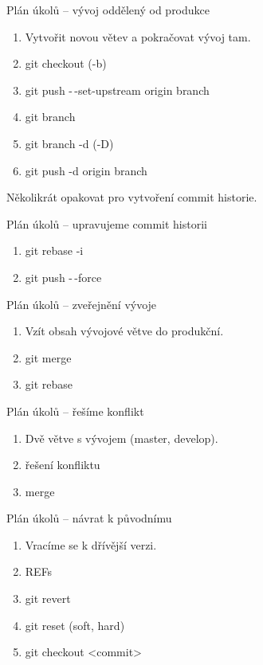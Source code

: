 \documentclass[14pt]{beamer}
\begin{document}
	\begin{frame}{Plán úkolů -- vývoj oddělený od produkce}
	\begin{enumerate}
		\item Vytvořit novou větev a pokračovat vývoj tam.
		\item git checkout (-b)
		\item git push -\,-set-upstream origin branch
		\item git branch
		\item git branch -d (-D)
		\item git push -d origin branch
	\end{enumerate}
	Několikrát opakovat pro vytvoření commit historie.
	\end{frame}

	\begin{frame}{Plán úkolů -- upravujeme commit historii}
		\begin{enumerate}
			\item git rebase -i
			\item git push -\,-force
		\end{enumerate}
	\end{frame}
	

	\begin{frame}{Plán úkolů -- zveřejnění vývoje}
		\begin{enumerate}
			\item Vzít obsah vývojové větve do produkční.
			\item git merge
			\item git rebase
		\end{enumerate}
	\end{frame}

	\begin{frame}{Plán úkolů -- řešíme konflikt}
		\begin{enumerate}
			\item Dvě větve s vývojem (master, develop).
			\item řešení konfliktu
			\item merge
		\end{enumerate}
	\end{frame}

	\begin{frame}{Plán úkolů -- návrat k původnímu}
	\begin{enumerate}
		\item Vracíme se k dřívější verzi.
		\item REFs
		\item git revert
		\item git reset (soft, hard)
		\item git checkout <commit>
	\end{enumerate}
	\end{frame}
\end{document}

